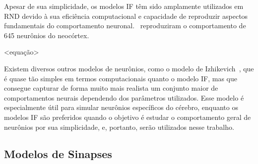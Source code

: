 Apesar de sua simplicidade, os modelos IF têm sido amplamente utilizados em RND devido à sua eficiência computacional e capacidade
de reproduzir aspectos fundamentais do comportamento neuronal.\ \cite{teeterGeneralized2018} reproduziram o comportamento de 645
neurônios do neocórtex. %


<equação>

Existem diversos outros modelos de neurônios, como o modelo de Izhikevich~\cite{izhikevichSimple2003}, que é quase tão simples em
termos computacionais quanto o modelo IF, mas que consegue capturar de forma muito mais realista um conjunto maior de
comportamentos neurais dependendo dos parâmetros utilizados. Esse modelo é especialmente útil para simular neurônios específicos
do cérebro, enquanto os modelos IF são preferidos quando o objetivo é estudar o comportamento geral de neurônios por sua
simplicidade, e, portanto, serão utilizados nesse trabalho.

\subsection{Modelos de Sinapses}\label{subsection_modelos_sinapses}




